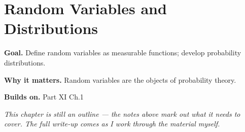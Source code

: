 \chapter{Random Variables and Distributions}
\label{ch:11-probability-theory-02}

\begin{chapterintro}
\textbf{Goal.} Define random variables as measurable functions; develop probability distributions.

\textbf{Why it matters.} Random variables are the objects of probability theory.

\textbf{Builds on.} Part XI Ch.1
\end{chapterintro}

\textit{This chapter is still an outline --- the notes above mark out what it needs to cover. The full write-up comes as I work through the material myself.}
